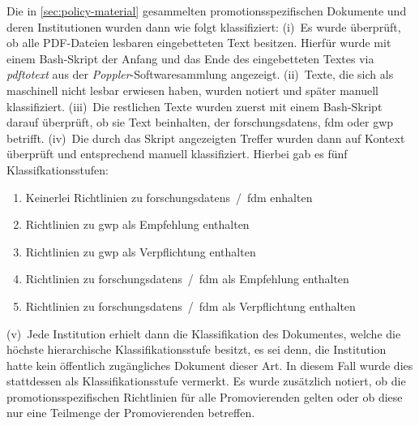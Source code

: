 Die in \cref{sec:policy-material} gesammelten promotionsspezifischen Dokumente und deren Institutionen wurden dann wie folgt klassifiziert:
(i)~Es wurde überprüft, ob alle PDF-Dateien lesbaren eingebetteten Text besitzen.
Hierfür wurde mit einem Bash-Skript \autocite{my-dataset} der Anfang und das Ende des eingebetteten Textes via \emph{pdftotext} aus der \emph{Poppler}-Softwaresammlung \autocite{Poppler} angezeigt.
% 
(ii)~Texte, die sich als maschinell nicht lesbar erwiesen haben, wurden notiert und später manuell klassifiziert.
(iii)~Die restlichen Texte wurden zuerst mit einem Bash-Skript \autocite{my-dataset} darauf überprüft, ob sie Text beinhalten, der \glspl{forschungsdaten}, \gls{fdm} oder \gls{gwp} betrifft.
% 
(iv)~Die durch das Skript angezeigten Treffer wurden dann auf Kontext überprüft und entsprechend manuell klassifiziert.
Hierbei gab es fünf Klassifkationsstufen:
\begin{enumerate}
    \item Keinerlei Richtlinien zu \glspl{forschungsdaten}~/~\gls{fdm} enhalten
    \item Richtlinien zu \gls{gwp} als Empfehlung enthalten
    \item Richtlinien zu \gls{gwp} als Verpflichtung enthalten
    \item Richtlinien zu \glspl{forschungsdaten}~/~\gls{fdm} als Empfehlung enthalten
    \item Richtlinien zu \glspl{forschungsdaten}~/~\gls{fdm} als Verpflichtung enthalten
\end{enumerate}
(v)~Jede Institution erhielt dann die Klassifikation des Dokumentes, welche die höchste hierarchische Klassifikationsstufe besitzt, es sei denn, die Institution hatte kein öffentlich zugängliches Dokument dieser Art.
In diesem Fall wurde dies stattdessen als Klassifikationsstufe vermerkt.
Es wurde zusätzlich notiert, ob die promotionsspezifischen Richtlinien für alle Promovierenden gelten oder ob diese nur eine Teilmenge der Promovierenden betreffen.
\pagebreak

